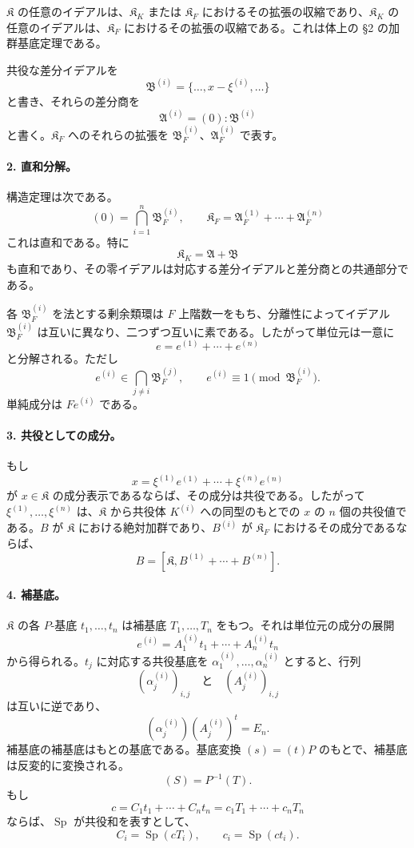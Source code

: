 \documentclass[11pt]{article}
\begin{document}
\(\mathfrak K\) の任意のイデアルは、\(\mathfrak K_K\) または \(\mathfrak K_F\) におけるその拡張の収縮であり、\(\mathfrak K_K\) の任意のイデアルは、\(\mathfrak K_F\) におけるその拡張の収縮である。これは体上の §2 の加群基底定理である。

共役な差分イデアルを
\[
        \mathfrak B^{(i)}=\{\ldots,x-\xi^{(i)},\ldots\}
\]
と書き、それらの差分商を
\[
        \mathfrak A^{(i)}=(0):\mathfrak B^{(i)}
\]
と書く。\(\mathfrak K_F\) へのそれらの拡張を \(\mathfrak B_F^{(i)}\)、\(\mathfrak A_F^{(i)}\) で表す。

\paragraph{2. 直和分解。}
構造定理は次である。
\[
        (0)=\bigcap_{i=1}^n \mathfrak B_F^{(i)},
        \qquad
        \mathfrak K_F=\mathfrak A_F^{(1)}+
        \cdots+\mathfrak A_F^{(n)}
\]
これは直和である。特に
\[
        \mathfrak K_K=\mathfrak A+\mathfrak B
\]
も直和であり、その零イデアルは対応する差分イデアルと差分商との共通部分である。

各 \(\mathfrak B_F^{(i)}\) を法とする剰余類環は \(F\) 上階数一をもち、分離性によってイデアル \(\mathfrak B_F^{(i)}\) は互いに異なり、二つずつ互いに素である。したがって単位元は一意に
\[
        e=e^{(1)}+
        \cdots+e^{(n)}
\]
と分解される。ただし
\[
        e^{(i)}\in\bigcap_{j\ne i}\mathfrak B_F^{(j)},
        \qquad
        e^{(i)}\equiv1\pmod {\mathfrak B_F^{(i)}}.
\]
単純成分は \(Fe^{(i)}\) である。

\paragraph{3. 共役としての成分。}
もし
\[
        x=\xi^{(1)}e^{(1)}+
        \cdots+\xi^{(n)}e^{(n)}
\]
が \(x\in\mathfrak K\) の成分表示であるならば、その成分は共役である。したがって \(\xi^{(1)},\ldots,\xi^{(n)}\) は、\(\mathfrak K\) から共役体 \(K^{(i)}\) への同型のもとでの \(x\) の \(n\) 個の共役値である。\(B\) が \(\mathfrak K\) における絶対加群であり、\(B^{(i)}\) が \(\mathfrak K_F\) におけるその成分であるならば、
\[
        B=[\mathfrak K,B^{(1)}+\cdots+B^{(n)}].
\]

\paragraph{4. 補基底。}
\(\mathfrak K\) の各 \(P\)-基底 \(t_1,\ldots,t_n\) は補基底 \(T_1,\ldots,T_n\) をもつ。それは単位元の成分の展開
\[
        e^{(i)}=A_1^{(i)}t_1+
        \cdots+A_n^{(i)}t_n
\]
から得られる。\(t_j\) に対応する共役基底を \(\alpha_1^{(i)},\ldots,\alpha_n^{(i)}\) とすると、行列
\[
        (\alpha_j^{(i)})_{i,j}
        \quad\text{と}\quad
        (A_j^{(i)})_{i,j}
\]
は互いに逆であり、
\[
        (\alpha_j^{(i)})(A_j^{(i)})^{t}=E_n.
\]
補基底の補基底はもとの基底である。基底変換 \((s)=(t)P\) のもとで、補基底は反変的に変換される。
\[
        (S)=P^{-1}(T).
\]
もし
\[
        c=C_1t_1+
        \cdots+C_nt_n
        =c_1T_1+
        \cdots+c_nT_n
\]
ならば、\(\operatorname{Sp}\) が共役和を表すとして、
\[
        C_i=\operatorname{Sp}(cT_i),
        \qquad
        c_i=\operatorname{Sp}(ct_i).
\]
\end{document}
